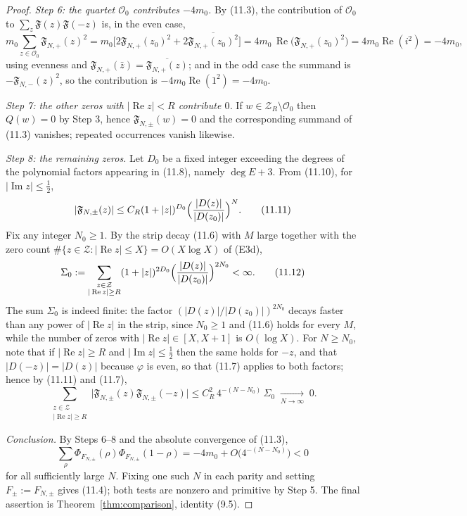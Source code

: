 \documentclass[11pt]{amsart}
\theoremstyle{definition}
\theoremstyle{remark}
\newcommand{\Rel}{\operatorname{Re}}
\newcommand{\Iml}{\operatorname{Im}}
\begin{document}
\begin{proof}
\emph{Step 6: the quartet $\mathcal O_0$ contributes $-4m_0$.}  By (11.3), the
contribution of $\mathcal O_0$ to $\sum_{z}\mathfrak F(z)\mathfrak F(-z)$ is,
in the even case,
\[
  m_0\!\!\sum_{z\in\mathcal O_0}\!\!\mathfrak F_{N,+}(z)^2
  =m_0\bigl[2\mathfrak F_{N,+}(z_0)^2+2\overline{\mathfrak F_{N,+}(z_0)^2}\bigr]
  =4m_0\,\Rel\bigl(\mathfrak F_{N,+}(z_0)^2\bigr)=4m_0\Rel(i^2)=-4m_0 ,
\]
using evenness and $\mathfrak F_{N,+}(\bar z)=\overline{\mathfrak F_{N,+}(z)}$;
and in the odd case the summand is $-\mathfrak F_{N,-}(z)^2$, so the
contribution is $-4m_0\Rel(1^2)=-4m_0$.

\emph{Step 7: the other zeros with $|\Rel z|<R$ contribute $0$.}  If
$w\in\mathcal Z_R\setminus\mathcal O_0$ then $Q(w)=0$ by Step 3, hence
$\mathfrak F_{N,\pm}(w)=0$ and the corresponding summand of (11.3) vanishes;
repeated occurrences vanish likewise.

\emph{Step 8: the remaining zeros.}  Let $D_0$ be a fixed integer exceeding
the degrees of the polynomial factors appearing in (11.8), namely
$\deg E+3$.  From (11.10), for
$|\Iml z|\le\tfrac12$,
\begin{equation}
  |\mathfrak F_{N,\pm}(z)|\le C_R(1+|z|)^{D_0}
     \Bigl(\frac{|D(z)|}{|D(z_0)|}\Bigr)^{N}.
\tag{11.11}
\end{equation}
Fix any integer $N_0\ge1$.  By the strip decay (11.6) with $M$ large together
with the zero count $\#\{z\in\mathcal Z:|\Rel z|\le X\}=O(X\log X)$ of (E3d),
\begin{equation}
  \Sigma_0:=\sum_{\substack{z\in\mathcal Z\\|\Rel z|\ge R}}(1+|z|)^{2D_0}
     \Bigl(\frac{|D(z)|}{|D(z_0)|}\Bigr)^{2N_0}<\infty .
\tag{11.12}
\end{equation}
The sum $\Sigma_0$ is indeed finite: the factor $(|D(z)|/|D(z_0)|)^{2N_0}$ decays
faster than any power of $|\Rel z|$ in the strip, since $N_0\ge1$ and (11.6)
holds for every $M$, while the number of zeros with $|\Rel z|\in[X,X+1]$ is
$O(\log X)$.
For $N\ge N_0$, note that if $|\Rel z|\ge R$ and $|\Iml z|\le\tfrac12$ then the
same holds for $-z$, and that $|D(-z)|=|D(z)|$ because $\varphi$ is even, so
that (11.7) applies to both factors; hence by (11.11) and (11.7),
\[
  \sum_{\substack{z\in\mathcal Z\\|\Rel z|\ge R}}
    \bigl|\mathfrak F_{N,\pm}(z)\mathfrak F_{N,\pm}(-z)\bigr|
  \le C_R^2\,4^{-(N-N_0)}\,\Sigma_0\;\xrightarrow[N\to\infty]{}\;0 .
\]

\emph{Conclusion.}  By Steps 6--8 and the absolute convergence of (11.3),
\[
  \sum_\rho\Phi_{F_{N,\pm}}(\rho)\Phi_{F_{N,\pm}}(1-\rho)
  =-4m_0+O\bigl(4^{-(N-N_0)}\bigr)<0
\]
for all sufficiently large $N$.  Fixing one such $N$ in each parity and setting
$F_\pm:=F_{N,\pm}$ gives (11.4); both tests are nonzero and primitive by
Step 5.  The final assertion is Theorem~\ref{thm:comparison}, identity (9.5).
\end{proof}
\end{document}

